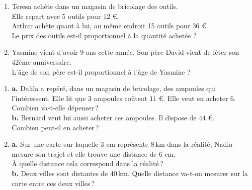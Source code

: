 \documentclass[11pt]{article}
\begin{document}
\begin{exercicedevoir}
\begin{enumerate}[itemsep=1.4em]
\item Teresa achète dans un magasin de bricolage des outils.\\Elle  repart avec 5 outils pour $12$\,\,€.\\ Arthur achète quant à lui, au même endroit 15 outils pour $36$\,\,€.\\Le prix des outils est-il proportionnel à la quantité achetée  ?
\item Yasmine vient d'avoir 9 ans cette année. Son père David vient de fêter  son 42ème anniversaire.\\L'âge de son père est-il proportionnel à l'âge de Yasmine ?
\end{enumerate}
\end{exercicedevoir}

\begin{exercicedevoir}
\begin{enumerate}[itemsep=1em]
\item \textbf {a.}  Dalila a repéré, dans un magasin de bricolage, des ampoules qui l'intéressent. Elle lit que 3 ampoules coûtent $11$\,\,€. Elle veut en acheter 6.\\ Combien va-t-elle dépenser\,? \\\textbf {b.}  Bernard veut lui aussi acheter ces ampoules. Il dispose de $44$\,\,€.\\ Combien peut-il en acheter\,?\\
\item \textbf {a.}  Sur une carte sur laquelle 3 cm représente 8\,km dans la réalité,
Nadia mesure son trajet et elle trouve une distance de 6 cm. \\À quelle distance cela correspond dans la réalité\,? \\ \textbf {b.}  Deux villes sont distantes de 40\,km. Quelle distance va-t-on mesurer sur la carte entre ces deux villes\,?
\end{enumerate}
\end{exercicedevoir}
\end{document}
